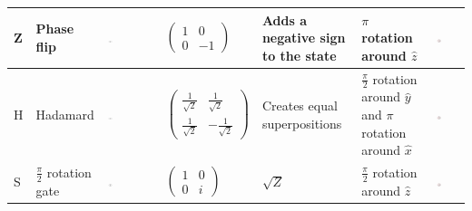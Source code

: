\begin{table}[ht!]
\begin{tabular}{ C{0.3cm}  C{2cm}  C{1.5cm}  C{1.5cm} C{2.5cm} C{2cm} C{3.5cm}}
Z & Phase flip & \includegraphics[width=0.1\textwidth]{img/zcircuit.png} & $\begin{pmatrix}
 1 & 0 \\ 
 0 & -1
 \end{pmatrix}$ & Adds a negative sign to the \1 state & $\pi$ rotation around $\hat{z}$ & \includegraphics[width=0.2\textwidth]{img/blochzgate.png} \\\midrule 
H & Hadamard & \includegraphics[width=0.1\textwidth]{img/hcircuit.png}  & $\begin{pmatrix}
 \frac{1}{\sqrt{2}} & \frac{1}{\sqrt{2}} \\ 
 \frac{1}{\sqrt{2}} & -\frac{1}{\sqrt{2}}
 \end{pmatrix}$ & Creates equal superpositions & $\frac{\pi}{2}$ rotation around $\hat{y}$ and $\pi$ rotation around $\hat{x}$ & \includegraphics[width=0.2\textwidth]{img/blochhadamard.png}\\\midrule
S & $\frac{\pi}{2}$ rotation gate & \includegraphics[width=0.1\textwidth]{img/scircuit.png} & $\begin{pmatrix}
 1 & 0 \\ 
 0 & i
 \end{pmatrix}$ & $\sqrt{Z}$ & $\frac{\pi}{2}$ rotation around $\hat{z}$ &  \includegraphics[width=0.2\textwidth]{img/blochsgate.png}\\\midrule

\end{tabular}
\end{table}
